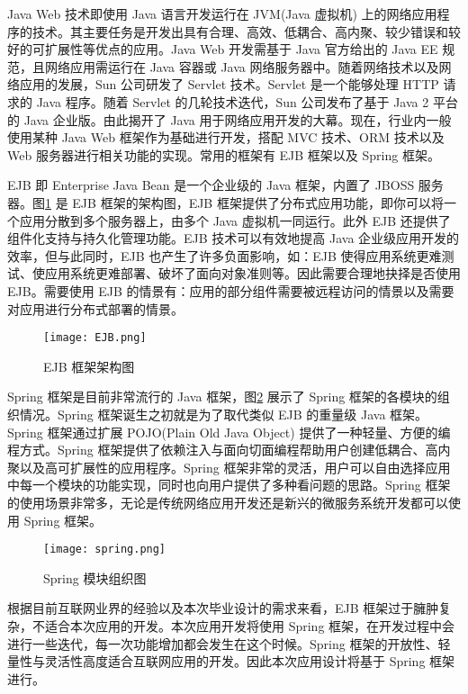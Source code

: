 Java Web 技术即使用 Java 语言开发运行在 JVM(Java 虚拟机) 上的网络应用程序的技术。其主要任务是开发出具有合理、高效、低耦合、高内聚、较少错误和较好的可扩展性等优点的应用\cite{arnold2005java}。Java Web 开发需基于 Java 官方给出的 Java EE 规范，且网络应用需运行在 Java 容器或 Java 网络服务器中。随着网络技术以及网络应用的发展，Sun 公司研发了 Servlet 技术。Servlet 是一个能够处理 HTTP 请求的 Java 程序。随着 Servlet 的几轮技术迭代，Sun 公司发布了基于 Java 2 平台的 Java 企业版。由此揭开了 Java 用于网络应用开发的大幕。现在，行业内一般使用某种 Java Web 框架作为基础进行开发，搭配 MVC 技术、ORM 技术以及 Web 服务器进行相关功能的实现。常用的框架有 EJB 框架以及 Spring 框架\cite{williams2014professional}。

EJB 即 Enterprise Java Bean 是一个企业级的 Java 框架，内置了 JBOSS 服务器。图\ref{fig:ejb} 是 EJB 框架的架构图，EJB 框架提供了分布式应用功能，即你可以将一个应用分散到多个服务器上，由多个 Java 虚拟机一同运行\cite{johnson2004expert}。此外 EJB 还提供了组件化支持与持久化管理功能。EJB 技术可以有效地提高 Java 企业级应用开发的效率，但与此同时，EJB 也产生了许多负面影响，如：EJB 使得应用系统更难测试、使应用系统更难部署、破坏了面向对象准则等。因此需要合理地抉择是否使用 EJB。需要使用 EJB 的情景有：应用的部分组件需要被远程访问的情景以及需要对应用进行分布式部署的情景。

\begin{figure}[!ht]
    \centering
    \texttt{[image: EJB.png]}
    \caption{EJB 框架架构图}
    \label{fig:ejb}
\end{figure}

Spring 框架是目前非常流行的 Java 框架，图\ref{fig:spring} 展示了 Spring 框架的各模块的组织情况。Spring 框架诞生之初就是为了取代类似 EJB 的重量级 Java 框架。Spring 框架通过扩展 POJO(Plain Old Java Object) 提供了一种轻量、方便的编程方式。Spring 框架提供了依赖注入与面向切面编程帮助用户创建低耦合、高内聚以及高可扩展性的应用程序。Spring 框架非常的灵活，用户可以自由选择应用中每一个模块的功能实现，同时也向用户提供了多种看问题的思路\cite{walls2005spring}。Spring 框架的使用场景非常多，无论是传统网络应用开发还是新兴的微服务系统开发都可以使用 Spring 框架。

\begin{figure}[!ht]
    \centering
    \texttt{[image: spring.png]}
    \caption{Spring 模块组织图}
    \label{fig:spring}
\end{figure}

根据目前互联网业界的经验以及本次毕业设计的需求来看，EJB 框架过于臃肿复杂，不适合本次应用的开发。本次应用开发将使用 Spring 框架，在开发过程中会进行一些迭代，每一次功能增加都会发生在这个时候。Spring 框架的开放性、轻量性与灵活性高度适合互联网应用的开发。因此本次应用设计将基于 Spring 框架进行\cite{walls2016spring}。


